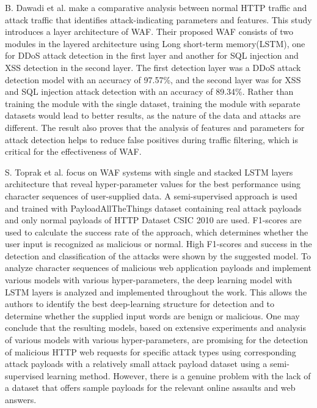 B. Dawadi et al. \cite{Dawadi} make a comparative analysis between normal HTTP traffic and attack traffic that identifies attack-indicating parameters and features. This study introduces a layer architecture of WAF. Their proposed WAF consists of two modules in the layered architecture using Long short-term memory(LSTM), one for DDoS attack detection in the first layer and another for SQL injection and XSS detection in the second layer. The first detection layer was a DDoS attack detection model with an accuracy of 97.57\%, and the second layer was for XSS and SQL injection attack detection with an accuracy of 89.34\%. Rather than training the module with the single dataset, training the module with separate datasets would lead to better results, as the nature of the data and attacks are different. The result also proves that the analysis of features and parameters for attack detection helps to reduce false positives during traffic filtering, which is critical for the effectiveness of WAF.


S. Toprak et al. \cite{Toprak} focus on WAF systems with single and stacked LSTM layers architecture that reveal hyper-parameter values for the best performance using character sequences of user-supplied data. A semi-supervised approach is used and trained with PayloadAllTheThings dataset containing real attack payloads and only normal payloads of HTTP Dataset CSIC 2010 are used. F1-scores are used to calculate the success rate of the approach, which determines whether the user input is recognized as malicious or normal. High F1-scores and success in the detection and classification of the attacks were shown by the suggested model.
To analyze character sequences of malicious web application payloads and implement various models with various hyper-parameters, the deep learning model with LSTM layers is analyzed and implemented throughout the work. This allows the authors to identify the best deep-learning structure for detection and to determine whether the supplied input words are benign or malicious. One may conclude that the resulting models, based on extensive experiments and analysis of various models with various hyper-parameters, are promising for the detection of malicious HTTP web requests for specific attack types using corresponding attack payloads with a relatively small attack payload dataset using a semi-supervised learning method. However, there is a genuine problem with the lack of a dataset that offers sample payloads for the relevant online assaults and web answers.

